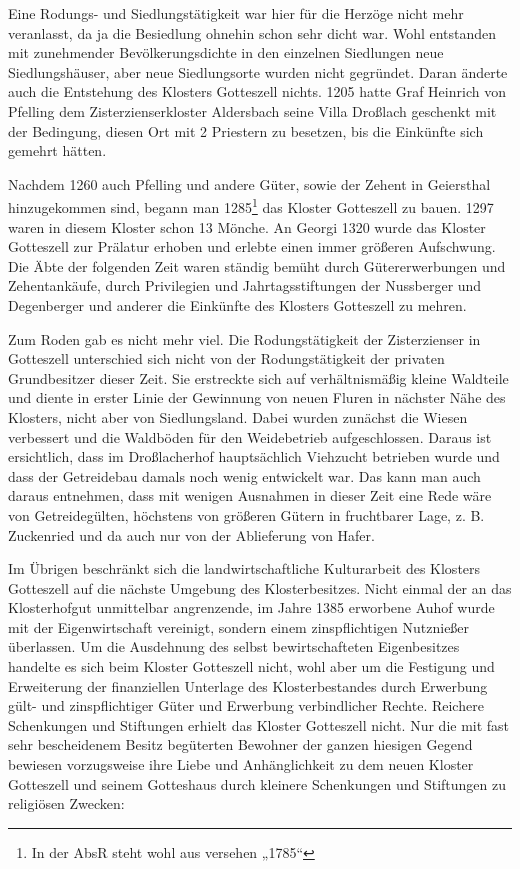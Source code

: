 \documentclass{book}
\begin{document}
Eine Rodungs- und Siedlungstätigkeit war hier für die Herzöge nicht mehr
veranlasst, da ja die Besiedlung ohnehin schon sehr dicht war. Wohl
entstanden mit zunehmender Bevölkerungsdichte in den einzelnen
Siedlungen neue Siedlungshäuser, aber neue Siedlungsorte wurden nicht
gegründet. Daran änderte auch die Entstehung des Klosters Gotteszell
nichts. 1205 hatte Graf Heinrich von Pfelling dem Zisterzienserkloster
Aldersbach seine Villa Droßlach geschenkt mit der Bedingung, diesen Ort
mit 2 Priestern zu besetzen, bis die Einkünfte sich gemehrt hätten.

Nachdem 1260 auch Pfelling und andere Güter, sowie der Zehent in
Geiersthal hinzugekommen sind, begann man 1285\footnote{In der AbsR
steht wohl aus versehen „1785“} das Kloster Gotteszell zu bauen. 1297
waren in diesem Kloster schon 13 Mönche. An Georgi 1320 wurde das
Kloster Gotteszell zur Prälatur erhoben und erlebte einen immer größeren
Aufschwung. Die Äbte der folgenden Zeit waren ständig bemüht durch
Gütererwerbungen und Zehentankäufe, durch Privilegien und
Jahrtagsstiftungen der Nussberger und Degenberger und anderer die
Einkünfte des Klosters Gotteszell zu mehren.

Zum Roden gab es nicht mehr viel. Die Rodungstätigkeit der Zisterzienser
in Gotteszell unterschied sich nicht von der Rodungstätigkeit der
privaten Grundbesitzer dieser Zeit. Sie erstreckte sich auf
verhältnismäßig kleine Waldteile und diente in erster Linie der
Gewinnung von neuen Fluren in nächster Nähe des Klosters, nicht aber von
Siedlungsland. Dabei wurden zunächst die Wiesen verbessert und die
Waldböden für den Weidebetrieb aufgeschlossen. Daraus ist ersichtlich,
dass im Droßlacherhof hauptsächlich Viehzucht betrieben wurde und dass
der Getreidebau damals noch wenig entwickelt war. Das kann man auch
daraus entnehmen, dass mit wenigen Ausnahmen in dieser Zeit eine Rede
wäre von Getreidegülten, höchstens von größeren Gütern in fruchtbarer
Lage, z. B. Zuckenried und da auch nur von der Ablieferung von Hafer.

Im Übrigen beschränkt sich die landwirtschaftliche Kulturarbeit des
Klosters Gotteszell auf die nächste Umgebung des Klosterbesitzes. Nicht
einmal der an das Klosterhofgut unmittelbar angrenzende, im Jahre 1385
erworbene Auhof wurde mit der Eigenwirtschaft vereinigt, sondern einem
zinspflichtigen Nutznießer überlassen. Um die Ausdehnung des selbst
bewirtschafteten Eigenbesitzes handelte es sich beim Kloster Gotteszell
nicht, wohl aber um die Festigung und Erweiterung der finanziellen
Unterlage des Klosterbestandes durch Erwerbung gült- und zinspflichtiger
Güter und Erwerbung verbindlicher Rechte. Reichere Schenkungen und
Stiftungen erhielt das Kloster Gotteszell nicht. Nur die mit fast sehr
bescheidenem Besitz begüterten Bewohner der ganzen hiesigen Gegend
bewiesen vorzugsweise ihre Liebe und Anhänglichkeit zu dem neuen Kloster
Gotteszell und seinem Gotteshaus durch kleinere Schenkungen und
Stiftungen zu religiösen Zwecken:
\end{document}
